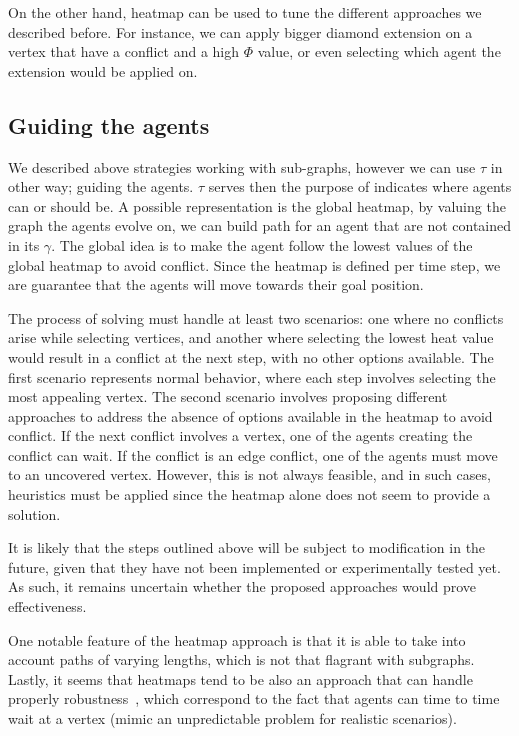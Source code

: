 On the other hand, heatmap can be used to tune the different approaches we described before. For instance, we can apply bigger diamond extension on a vertex that have a conflict and a high \(\Phi\) value, or even selecting which agent the extension would be applied on. 

\newpage
\subsection{Guiding the agents}

We described above strategies working with sub-graphs, however we can use \(\tau\) in other way; guiding the agents. \(\tau\) serves then the purpose of indicates where agents can or should be. A possible representation is the global heatmap, by valuing the graph the agents evolve on, we can build path for an agent that are not contained in its \(\gamma\). The global idea is to make the agent follow the lowest values of the global heatmap to avoid conflict. Since the heatmap is defined per time step, we are guarantee that the agents will move towards their goal position.

The process of solving must handle at least two scenarios: one where no conflicts arise while selecting vertices, and another where selecting the lowest heat value would result in a conflict at the next step, with no other options available. The first scenario represents normal behavior, where each step involves selecting the most appealing vertex. The second scenario involves proposing different approaches to address the absence of options available in the heatmap to avoid conflict. If the next conflict involves a vertex, one of the agents creating the conflict can wait. If the conflict is an edge conflict, one of the agents must move to an uncovered vertex. However, this is not always feasible, and in such cases, heuristics must be applied since the heatmap alone does not seem to provide a solution.

It is likely that the steps outlined above will be subject to modification in the future, given that they have not been implemented or experimentally tested yet. As such, it remains uncertain whether the proposed approaches would prove effectiveness.

One notable feature of the heatmap approach is that it is able to take into account paths of varying lengths, which is not that flagrant with subgraphs. Lastly, it seems that heatmaps tend to be also an approach that can handle properly robustness~\cite{atstfestko20a}, which correspond to the fact that agents can time to time wait at a vertex (mimic an unpredictable problem for realistic scenarios).



